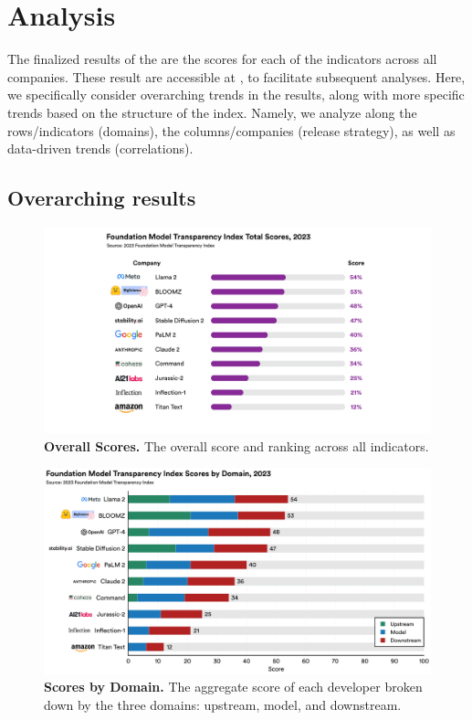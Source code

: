 \hypertarget{results}{\section{Analysis}}
\label{sec:results}

The finalized results of the \projectname are the scores for each of the \numindicators indicators across all \numcompanies companies.
These result are accessible at \materialsUrl, to facilitate subsequent analyses.
Here, we specifically consider overarching trends in the results, along with more specific trends based on the structure of the index.
Namely, we analyze along the rows/indicators (\eg domains), the columns/companies (\eg release strategy), as well as data-driven trends (\eg correlations).

\hypertarget{overarching-results}{\subsection{Overarching results}}
\label{sec:overarching-results}

\begin{figure}
\centering
\includegraphics[keepaspectratio, height=\textheight, width=\textwidth]{figures/f7.pdf}
\caption{\textbf{Overall Scores.} The overall \projectname score and ranking across all \numindicators indicators.}
\label{fig:overall-scores}
\end{figure}

\begin{figure}
\centering
\includegraphics[keepaspectratio, height=\textheight, width=\textwidth]{figures/f8.pdf}
\caption{\textbf{Scores by Domain.} The aggregate score of each developer broken down by the three domains: upstream, model, and downstream.
}
\label{fig:domain-scores}
\end{figure}

